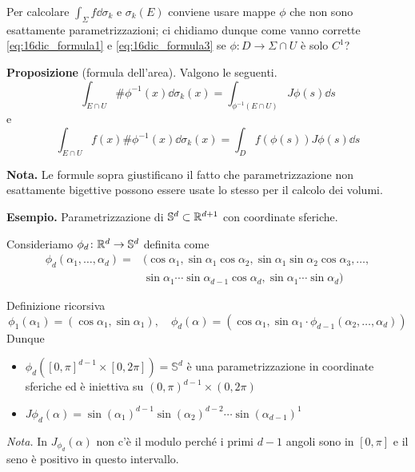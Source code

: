 Per calcolare $\int_\Sigma f \dd \sigma_k$ e $\sigma_k(E)$ conviene usare mappe $\phi$ che non sono esattamente parametrizzazioni; ci chidiamo dunque come vanno corrette \eqref{eq:16dic_formula1} e \eqref{eq:16dic_formula3} se $\phi \colon D \to \Sigma \cap U$ è solo $C^1$?

\textbf{Proposizione} (formula dell'area). Valgono le seguenti.
\begin{equation}
	\tag{1'}
	\int_{E \cap U} \# \phi^{-1}(x) \dd \sigma_k(x) = \int_{\phi^{-1}(E \cap U)} J\phi(s) \dd s
\end{equation}
e
\begin{equation}
	\tag{3'}
	\int_{E \cap U} f(x) \# \phi^{-1}(x) \dd \sigma_k (x) = \int_D f(\phi(s)) J\phi(s) \dd s
\end{equation}

\textbf{Nota.} Le formule sopra giustificano il fatto che parametrizzazione non esattamente bigettive possono essere usate lo stesso per il calcolo dei volumi.

\vss

\textbf{Esempio.} Parametrizzazione di $\mathbb{S}^d \subset \mathbb R^{d+1}$ con coordinate sferiche.

Consideriamo $\phi_d \colon \mathbb R^d \to \mathbb{S}^d$ definita come 
%
\begin{align*}
	\phi_d(\alpha_1,\ldots,\alpha_d) = & ( \cos \alpha_1, \sin \alpha_1 \cos \alpha_2, \sin \alpha_1 \sin \alpha_2 \cos \alpha_3,\ldots, \\
	& \sin \alpha_1 \cdots \sin \alpha_{d-1} \cos \alpha_d, \sin \alpha_1 \cdots \sin \alpha_d ) 
\end{align*}

Definizione ricorsiva
%
$$
\phi_1 (\alpha_1) = (\cos \alpha_1, \sin \alpha_1), \quad 
\phi_d(\alpha) = (\cos \alpha_1, \sin \alpha_1 \cdot \phi_{d-1}(\alpha_2,\ldots,\alpha_d))
$$
%
Dunque 
\begin{itemize}

	\item $\phi_d \left( [0,\pi]^{d-1} \times [0,2\pi] \right) = \mathbb{S}^d$ è una parametrizzazione in coordinate sferiche ed è iniettiva su $(0,\pi)^{d-1} \times (0,2\pi)$

	\item $J\phi_d(\alpha) = \sin(\alpha_1)^{d-1} \sin(\alpha_2)^{d-2} \cdots \sin(\alpha_{d-1})^1$

\end{itemize}

\textit{Nota.} In $J_{\phi_d}(\alpha)$ non c'è il modulo perché i primi $d-1$ angoli sono in $[0,\pi]$ e il seno è positivo in questo intervallo.

